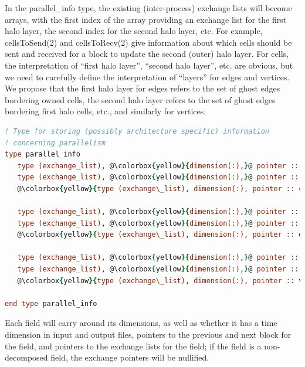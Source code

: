 \documentclass[11pt]{report}
\begin{document}
In the parallel\_info type, the existing (inter-process) exchange lists will become arrays, 
with the first index of the array providing an exchange list for the first halo layer, the second
index for the second halo layer, etc. For example, cellsToSend(2) and cellsToRecv(2) give 
information about which cells should be sent and received for a block to update the second
(outer) halo layer. For cells, the interpretation of ``first halo layer'', ``second halo layer'', etc.
are obvious, but we need to carefully define the interpretation of ``layers'' for edges and 
vertices. We propose that the first halo layer for edges refers to the set of ghost edges bordering owned cells, 
the second halo layer refers to the set of ghost edges bordering first halo cells, etc., and similarly
for vertices.
\linebreak

\begin{lstlisting}[language=fortran,escapechar=@,frame=single]
! Type for storing (possibly architecture specific) information 
! concerning parallelism
type parallel_info
   type (exchange_list), @\colorbox{yellow}{dimension(:),}@ pointer :: cellsToSend    
   type (exchange_list), @\colorbox{yellow}{dimension(:),}@ pointer :: cellsToRecv 
   @\colorbox{yellow}{type (exchange\_list), dimension(:), pointer :: cellsToCopy}@ 
    
   type (exchange_list), @\colorbox{yellow}{dimension(:),}@ pointer :: edgesToSend    
   type (exchange_list), @\colorbox{yellow}{dimension(:),}@ pointer :: edgesToRecv 
   @\colorbox{yellow}{type (exchange\_list), dimension(:), pointer :: edgesToCopy}@    
   
   type (exchange_list), @\colorbox{yellow}{dimension(:),}@ pointer :: verticesToSend      
   type (exchange_list), @\colorbox{yellow}{dimension(:),}@ pointer :: verticesToRecv
   @\colorbox{yellow}{type (exchange\_list), dimension(:), pointer :: verticesToCopy}@
    
end type parallel_info
\end{lstlisting}
\vspace{12pt}

Each field will carry around its dimensions, as well as whether it has a time dimension in input
and output files, pointers to the previous and next block for the field, and pointers to the exchange
lists for the field; if the field is a non-decomposed field, the exchange pointers will be nullified.
\linebreak
\end{document}
